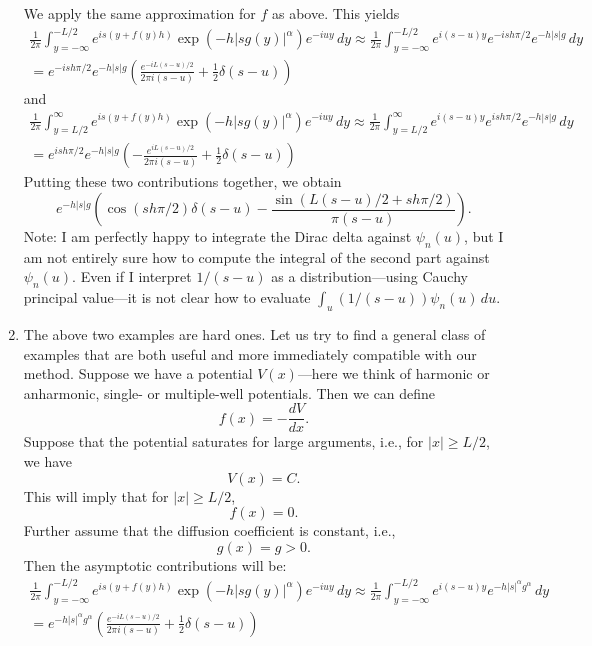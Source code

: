 \documentclass[11pt,letterpaper]{article}
\begin{document}
\begin{enumerate}
We apply the same approximation for $f$ as above.  This yields
\begin{multline*}
\frac{1}{2 \pi} \int_{y=-\infty}^{-L/2} e^{is\left(y+f(y)h\right)}\exp{\left(  -h |s g(y)|^{\alpha} \right)}e^{-iuy}\, dy \approx \frac{1}{2 \pi} \int_{y=-\infty}^{-L/2} e^{i(s-u)y} e^{-i s h \pi/2} e^{-h |s| g} \, dy \\
 = e^{-i s h \pi/2} e^{-h |s| g} \left( \frac{ e^{-iL (s-u)/2} }{2 \pi i (s-u)} + \frac{1}{2} \delta(s-u) \right)
\end{multline*}
and
\begin{multline*}
\frac{1}{2 \pi} \int_{y=L/2}^{\infty} e^{is\left(y+f(y)h\right)}\exp{\left(  -h |s g(y)|^{\alpha} \right)}e^{-iuy}\, dy \approx \frac{1}{2 \pi} \int_{y=L/2}^{\infty} e^{i(s-u)y} e^{i s h \pi/2} e^{-h |s| g} \, dy \\
 = e^{i s h \pi/2} e^{-h |s| g} \left( -\frac{ e^{iL (s-u)/2} }{2 \pi i (s-u)} + \frac{1}{2} \delta(s-u) \right)
\end{multline*}
Putting these two contributions together, we obtain
$$
e^{-h |s| g} \left( \cos(s h \pi/2) \delta(s-u) - \frac{ \sin(L(s-u)/2 + s h \pi/2) }{ \pi (s-u) } \right).
$$
Note: I am perfectly happy to integrate the Dirac delta against $\psi_n(u)$, but I am not entirely sure how to compute the integral of the second part against $\psi_n(u)$.  Even if I interpret $1/(s-u)$ as a distribution---using Cauchy principal value---it is not clear how to evaluate $\int_u (1/(s-u)) \psi_n(u) \, du$.
\item The above two examples are hard ones.  Let us try to find a general class of examples that are both useful and more immediately compatible with our method.  Suppose we have a potential $V(x)$---here we think of harmonic or anharmonic, single- or multiple-well potentials.  Then we can define
$$
f(x) = -\frac{dV}{dx}.
$$
Suppose that the potential saturates for large arguments, i.e., for $|x| \geq L/2$, we have
$$
V(x) = C.
$$
This will imply that for $|x| \geq L/2$,
$$
f(x) = 0.
$$
Further assume that the diffusion coefficient is constant, i.e.,
$$
g(x) = g > 0.
$$
Then the asymptotic contributions will be:
\begin{multline*}
\frac{1}{2 \pi} \int_{y=-\infty}^{-L/2} e^{is\left(y+f(y)h\right)}\exp{\left(  -h |s g(y)|^{\alpha} \right)}e^{-iuy}\, dy \approx \frac{1}{2 \pi} \int_{y=-\infty}^{-L/2} e^{i(s-u)y} e^{-h |s|^\alpha g^\alpha} \, dy \\
 =  e^{-h |s|^\alpha g^\alpha} \left( \frac{ e^{-iL (s-u)/2} }{2 \pi i (s-u)} + \frac{1}{2} \delta(s-u) \right)

\end{multline*}
\end{enumerate}
\end{document}
